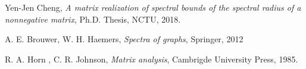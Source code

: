 \documentclass{beamer}
\theoremstyle{plain}
\theoremstyle{definition}
\begin{document}
\begin{frame}
\begin{thebibliography}{20}
\normalsize
{}

Yen-Jen Cheng, {\it  A matrix realization of spectral bounds
of the spectral radius of a nonnegative matrix}, Ph.D. Thesis, NCTU, 2018.

A. E. Brouwer, W. H. Haemers, {\it Spectra of graphs}, Springer, 2012

R. A. Horn , C. R. Johnson, {\it Matrix analysis}, Cambrigde University Press, 1985.


\end{thebibliography}
\end{frame}
\end{document}
